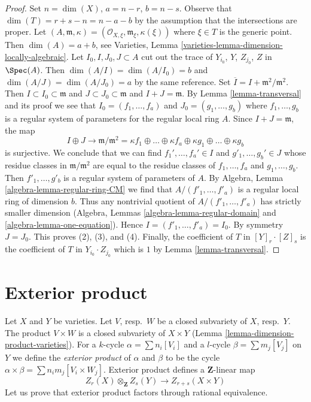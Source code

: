 \begin{proof}
Set $n = \dim(X)$, $a = n - r$, $b = n - s$. Observe that
$\dim(T) = r + s - n = n - a - b$ by the assumption that the
intersections are proper. Let $(A, \mathfrak m, \kappa) =
(\mathcal{O}_{X, \xi}, \mathfrak m_\xi, \kappa(\xi))$ where $\xi \in T$
is the generic point. Then $\dim(A) = a + b$, see
Varieties, Lemma \ref{varieties-lemma-dimension-locally-algebraic}.
Let $I_0, I, J_0, J \subset A$ cut out the trace of
$Y_{i_0}$, $Y$, $Z_{j_0}$, $Z$ in $\Spec(A)$.
Then $\dim(A/I) = \dim(A/I_0) = b$ and $\dim(A/J) = \dim(A/J_0) = a$
by the same reference. Set $\overline{I} = I + \mathfrak m^2/\mathfrak m^2$.
Then $I \subset I_0 \subset \mathfrak m$ and
$J \subset J_0 \subset \mathfrak m$ and $I + J = \mathfrak m$.
By Lemma \ref{lemma-transversal} and its proof we see that
$I_0 = (f_1, \ldots, f_a)$ and $J_0 = (g_1, \ldots, g_b)$
where $f_1, \ldots, g_b$ is a regular system of parameters
for the regular local ring $A$. Since $I + J = \mathfrak m$, the map
$$
I \oplus J \to
\mathfrak m/\mathfrak m^2 =
\kappa f_1
\oplus \ldots \oplus
\kappa f_a
\oplus
\kappa g_1
\oplus \ldots \oplus
\kappa g_b
$$
is surjective. We conclude that we can find
$f_1', \ldots, f_a' \in I$ and $g'_1, \ldots, g_b' \in J$
whose residue classes in $\mathfrak m/\mathfrak m^2$ are equal to the
residue classes of $f_1, \ldots, f_a$ and $g_1, \ldots, g_b$.
Then $f'_1, \ldots, g'_b$ is a regular system of parameters of $A$.
By Algebra, Lemma \ref{algebra-lemma-regular-ring-CM} we find that
$A/(f'_1, \ldots, f'_a)$ is a regular local ring of dimension $b$.
Thus any nontrivial quotient of $A/(f'_1, \ldots, f'_a)$
has strictly smaller dimension
(Algebra, Lemmas \ref{algebra-lemma-regular-domain} and
\ref{algebra-lemma-one-equation}). Hence $I = (f'_1, \ldots, f'_a) = I_0$.
By symmetry $J = J_0$. This proves (2), (3), and (4).
Finally, the coefficient of $T$ in $[Y]_r \cdot [Z]_s$
is the coefficient of $T$ in $Y_{i_0} \cdot Z_{j_0}$ which is
$1$ by Lemma \ref{lemma-transversal}.
\end{proof}



\section{Exterior product}
\label{section-exterior-product}

\noindent
Let $X$ and $Y$ be varieties.
Let $V$, resp.\ $W$ be a closed subvariety of $X$, resp.\ $Y$.
The product $V\times W$ is a closed subvariety of $X\times Y$
(Lemma \ref{lemma-dimension-product-varieties}).
For a $k$-cycle $\alpha = \sum n_i [V_i]$ and a $l$-cycle
$\beta = \sum m_j [V_j]$ on $Y$ we define the
{\it exterior product} of $\alpha$ and $\beta$ to be the cycle
$\alpha \times \beta = \sum n_i m_j [V_i \times W_j]$.
Exterior product defines a $\mathbf{Z}$-linear map
$$
Z_r(X) \otimes_\mathbf{Z} Z_s(Y) \longrightarrow Z_{r + s}(X \times Y)
$$
Let us prove that exterior product factors through rational equivalence.

